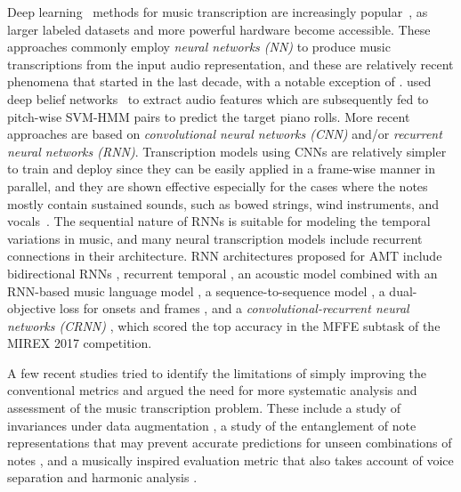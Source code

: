 

Deep learning~\cite{lecun2015deeplearning} methods for music transcription are increasingly popular~\cite{benetos2019amt}, as larger labeled datasets and more powerful hardware become accessible.
These approaches commonly employ \textit{neural networks (NN)} to produce music transcriptions from the input audio representation, and these are relatively recent phenomena that started in the last decade, with a notable exception of .
 used deep belief networks~\cite{hinton2006dbn} to extract audio features which are subsequently fed to pitch-wise SVM-HMM pairs to predict the target piano rolls.
More recent approaches are based on \textit{convolutional neural networks (CNN)} and/or \textit{recurrent neural networks (RNN)}.
Transcription models using CNNs are relatively simpler to train and deploy since they can be easily applied in a frame-wise manner in parallel, and they are shown effective especially for the cases where the notes mostly contain sustained sounds, such as bowed strings, wind instruments, and vocals~\cite{kelz2016framewise,bittner2017deepsalience}.
The sequential nature of RNNs is suitable for modeling the temporal variations in music, and many neural transcription models include recurrent connections in their architecture.
RNN architectures proposed for AMT include bidirectional RNNs \cite{bock2012rnn}, recurrent temporal  \cite{boulangerlewandowski2012temporal}, an acoustic model combined with an RNN-based music language model \cite{sigtia2015hybrid,sigtia2016endtoend,wang2018mlm},
a sequence-to-sequence model \cite{ullrich2017seq2seq},
a dual-objective loss for onsets and frames \cite{hawthorne2018onsetsframes},
and a \textit{convolutional-recurrent neural networks (CRNN)} \cite{thome2017crnn}, which scored the top accuracy in the MFFE subtask of the MIREX 2017 competition.



A few recent studies tried to identify the limitations of simply improving the conventional metrics and argued the need for more systematic analysis and assessment of the music transcription problem.
These include a study of invariances under data augmentation \cite{thickstun2018invariances}, a study of the entanglement of note representations that may prevent accurate predictions for unseen combinations of notes \cite{kelz2017entanglement}, and a musically inspired evaluation metric that also takes account of voice separation and harmonic analysis \cite{mcleod2018eval}.



